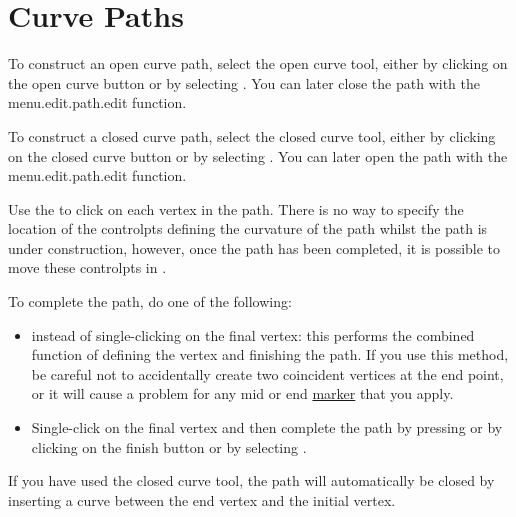 
\section{Curve Paths}\label{sec:newcurvepath}


To construct an open curve \gls{path}, select the open curve tool,
either by clicking on the open curve button or by selecting
. You can later close the \gls{path}
with the \gls{menu.edit.path.edit} function.


To construct a closed curve \gls{path}, select the closed curve tool,
either by clicking on the closed curve button or by selecting
. You can later open the \gls{path}
with the \gls{menu.edit.path.edit} function.

Use the  to click on each vertex in
the \gls*{path}.  There is no way to specify the location of the
\glspl{controlpt} defining the curvature of the \gls*{path} whilst the
\gls*{path} is under construction, however, once the
\gls*{path} has been completed, it is possible to move these
\glspl*{controlpt} in \editpathmode.

To complete the \gls*{path}, do one of the following:
\begin{itemize}
\item {} instead of single-clicking
on the final vertex: this performs the combined function of defining
the vertex and finishing the path. If you use this method, be
careful not to accidentally create two coincident vertices at the
end point, or it will cause a problem for any mid or end
\hyperref[sec:markers]{marker} that you apply.

\item Single-\gls{click} on the final vertex and then
complete the path by pressing  or by
clicking on the finish button or by selecting
.
\end{itemize}
If you have used the closed curve tool, the path will automatically
be closed by inserting a curve between the end vertex
and the initial vertex.


